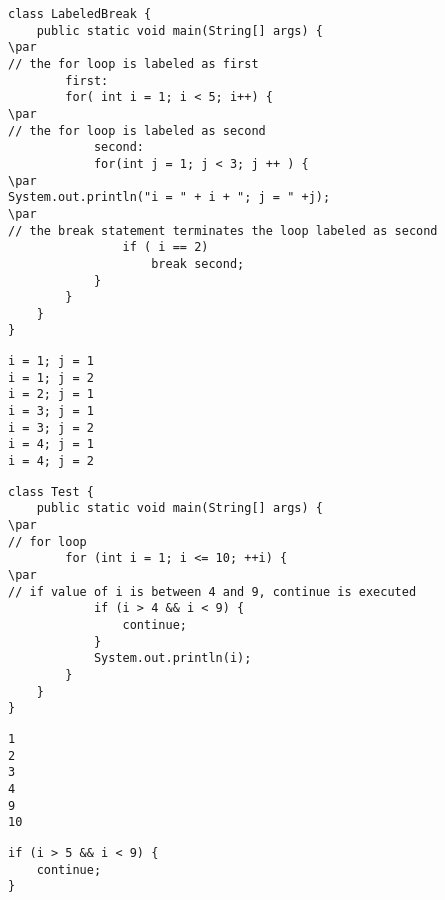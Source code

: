 \documentclass{book}
\def\lthtmlcheckvsize{\ifdim\ht\sizebox<\vsize 
  \ifdim\wd\sizebox<\hsize\expandafter\hfill\fi \expandafter\vfill
  \else\expandafter\vss\fi}%
\begin{document}
{\newpage\clearpage
{}%
\begin{lstlisting}
class LabeledBreak {
    public static void main(String[] args) {
\par
// the for loop is labeled as first
        first:
        for( int i = 1; i < 5; i++) {
\par
// the for loop is labeled as second
            second:
            for(int j = 1; j < 3; j ++ ) {
\par
System.out.println("i = " + i + "; j = " +j);
\par
// the break statement terminates the loop labeled as second   
                if ( i == 2)
                    break second;
            }
        }
    }
}
\end{lstlisting}%
\lthtmlfigureZ
\lthtmlcheckvsize\clearpage}

{\newpage\clearpage
{}%
\begin{lstlisting}
i = 1; j = 1
i = 1; j = 2
i = 2; j = 1
i = 3; j = 1
i = 3; j = 2
i = 4; j = 1
i = 4; j = 2
\end{lstlisting}%
\lthtmlfigureZ
\lthtmlcheckvsize\clearpage}

{\newpage\clearpage
{}%
\begin{lstlisting}
class Test {
    public static void main(String[] args) {
\par
// for loop
        for (int i = 1; i <= 10; ++i) {
\par
// if value of i is between 4 and 9, continue is executed 
            if (i > 4 && i < 9) {
                continue;
            }      
            System.out.println(i);
        }   
    }
}
\end{lstlisting}%
\lthtmlfigureZ
\lthtmlcheckvsize\clearpage}

{\newpage\clearpage
{}%
\begin{lstlisting}
1
2
​​​​3
4
9
10
\end{lstlisting}%
\lthtmlfigureZ
\lthtmlcheckvsize\clearpage}

{\newpage\clearpage
{}%
\begin{lstlisting}
if (i > 5 && i < 9) {
    continue;
}
\end{lstlisting}%
\lthtmlfigureZ
\lthtmlcheckvsize\clearpage}
\end{document}
